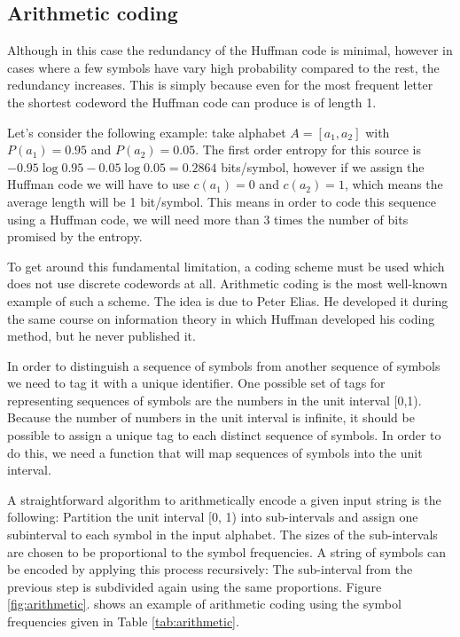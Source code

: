\documentclass{diploma_style}
\begin{document}
\subsection{Arithmetic coding}
Although in this case the redundancy of the Huffman code is minimal, however in cases where a few symbols have vary high probability compared to the rest, the redundancy increases. This is simply because even for the most frequent letter the shortest codeword the Huffman code can produce is of length 1.

Let's consider the following example: take alphabet $A=[a_1, a_2]$ with $P(a_1) = 0.95$ and $P(a_2) = 0.05$. The first order entropy for this source is $-0.95 \log 0.95 - 0.05 \log 0.05 = 0.2864$ bits/symbol, however if we assign the Huffman code we will have to use $c(a_1)=0$ and $c(a_2)=1$, which means the average length will be 1 bit/symbol. This means in order to code this sequence using a Huffman code, we will need more than 3 times the number of bits promised by the entropy.

To get around this fundamental limitation, a coding scheme must be used which does not use discrete codewords at all. Arithmetic coding is the most well-known example of such a scheme. The idea is due to Peter Elias. He developed it during the same course on information theory in which Huffman developed his coding method, but he never published it.

In order to distinguish a sequence of symbols from another sequence of symbols we need to
tag it with a unique identifier. One possible set of tags for representing sequences of symbols
are the numbers in the unit interval [0,1). Because the number of numbers in the unit interval
is infinite, it should be possible to assign a unique tag to each distinct sequence of symbols. In
order to do this, we need a function that will map sequences of symbols into the unit interval.

A straightforward algorithm to arithmetically encode a given input string is the
following: Partition the unit interval [0, 1) into sub-intervals and assign one subinterval
to each symbol in the input alphabet. The sizes of the sub-intervals are
chosen to be proportional to the symbol frequencies. A string of symbols can be
encoded by applying this process recursively: The sub-interval from the previous
step is subdivided again using the same proportions. Figure \ref{fig:arithmetic}. shows an example of
arithmetic coding using the symbol frequencies given in Table \ref{tab:arithmetic}.
\end{document}
